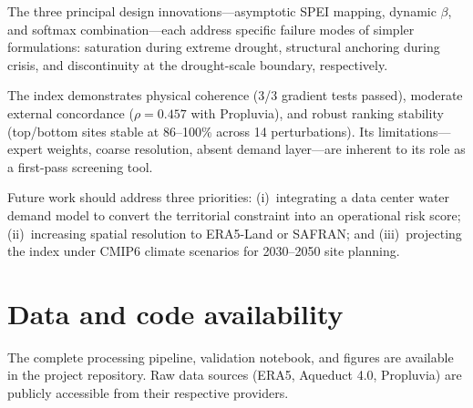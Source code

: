 \documentclass[11pt,a4paper]{article}
\begin{document}
The three principal design innovations---asymptotic SPEI mapping, dynamic $\beta$, and softmax combination---each address specific failure modes of simpler formulations: saturation during extreme drought, structural anchoring during crisis, and discontinuity at the drought-scale boundary, respectively.

The index demonstrates physical coherence (3/3 gradient tests passed), moderate external concordance ($\rho = 0.457$ with Propluvia), and robust ranking stability (top/bottom sites stable at 86--100\% across 14 perturbations). Its limitations---expert weights, coarse resolution, absent demand layer---are inherent to its role as a first-pass screening tool.

Future work should address three priorities: (i)~integrating a data center water demand model to convert the territorial constraint into an operational risk score; (ii)~increasing spatial resolution to ERA5-Land or SAFRAN; and (iii)~projecting the index under CMIP6 climate scenarios for 2030--2050 site planning.

\section*{Data and code availability}

The complete processing pipeline, validation notebook, and figures are available in the project repository. Raw data sources (ERA5, Aqueduct 4.0, Propluvia) are publicly accessible from their respective providers.
\end{document}
